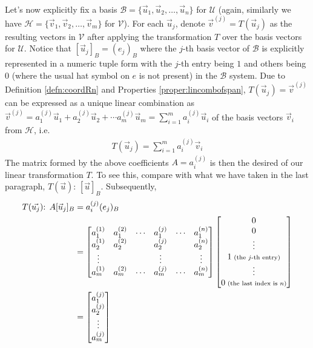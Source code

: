 \\
Let's now explicitly fix a basis $\mathcal{B} = \{\vec{u}_1, \vec{u}_2, \ldots, \vec{u}_n\}$ for $\mathcal{U}$ (again, similarly we have $\mathcal{H} = \{\vec{v}_1, \vec{v}_2, \ldots, \vec{v}_m\}$ for $\mathcal{V}$). For each $\vec{u}_j$, denote $\vec{v}^{(j)} = T(\vec{u}_j)$ as the resulting vectors in $\mathcal{V}$ after applying the transformation $T$ over the basis vectors for $\mathcal{U}$. Notice that $[\vec{u}_j]_B = (e_j)_B$ where the $j$-th basis vector of $\mathcal{B}$ is explicitly represented in a numeric tuple form with the $j$-th entry being $1$ and others being $0$ (where the usual hat symbol on $e$ is not present) in the $\mathcal{B}$ system. Due to Definition \ref{defn:coordRn} and Properties \ref{proper:lincombofspan}, $T(\vec{u}_j) = \vec{v}^{(j)}$ can be expressed as a unique linear combination as $\vec{v}^{(j)} = a_1^{(j)}\vec{u}_1 + a_2^{(j)}\vec{u}_2 + \cdots a_m^{(j)}\vec{u}_m = \sum_{i=1}^{m} a_i^{(j)}\vec{u}_i$ of the basis vectors $\vec{v}_i$ from $\mathcal{H}$, i.e.
\begin{align*}
T(\vec{u}_j) = \sum_{i=1}^{m} a_i^{(j)}\vec{v}_i
\end{align*}
The matrix formed by the above coefficients $A = a_i^{(j)}$ is then the desired  of our linear transformation $T$. To see this, compare with what we have taken in the last paragraph, $T(\vec{u})$: $[\vec{u}]_B$. Subsequently,
\begin{align*}
T(\vec{u_j})\text{: } A[\vec{u}_j]_B &= a_i^{(j)}(e_j)_B \\
&=
\begin{bmatrix}
a_1^{(1)} & a_1^{(2)} & \cdots & a_1^{(j)} & \cdots & a_1^{(n)} \\
a_2^{(1)} & a_2^{(2)} & & a_2^{(j)} & & a_2^{(n)} \\
\vdots & & & \vdots & & \vdots \\
a_m^{(1)} & a_m^{(2)} & \cdots & a_m^{(j)} & \cdots & a_m^{(n)}
\end{bmatrix}
\begin{bmatrix}
0 \\
0 \\
\vdots \\
1 {\scriptsize \text{ (the $j$-th entry)}} \\
\vdots \\
0 {\scriptsize \text{ (the last index is $n$)}}
\end{bmatrix} \\
&=
\begin{bmatrix}
a_1^{(j)} \\
a_2^{(j)} \\
\vdots \\
a_m^{(j)}
\end{bmatrix}
\end{align*}
